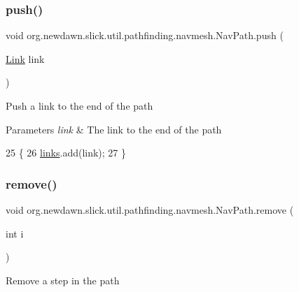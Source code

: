 \subsubsection{\texorpdfstring{push()}{push()}}
{\footnotesize\ttfamily void org.\+newdawn.\+slick.\+util.\+pathfinding.\+navmesh.\+Nav\+Path.\+push (\begin{DoxyParamCaption}\item[{\mbox{\hyperlink{classorg_1_1newdawn_1_1slick_1_1util_1_1pathfinding_1_1navmesh_1_1_link}{Link}}}]{link }\end{DoxyParamCaption})\hspace{0.3cm}{\ttfamily [inline]}}

Push a link to the end of the path


\begin{DoxyParams}{Parameters}
{\em link} & The link to the end of the path \\
\hline
\end{DoxyParams}

\begin{DoxyCode}
25                                 \{
26         \mbox{\hyperlink{classorg_1_1newdawn_1_1slick_1_1util_1_1pathfinding_1_1navmesh_1_1_nav_path_aa79523223a18486178fbb21fe550f253}{links}}.add(link);
27     \}
\end{DoxyCode}
\mbox{\label{classorg_1_1newdawn_1_1slick_1_1util_1_1pathfinding_1_1navmesh_1_1_nav_path_a9c30f810bc9b2eba2b244a34f26d1f88}} 
\subsubsection{\texorpdfstring{remove()}{remove()}}
{\footnotesize\ttfamily void org.\+newdawn.\+slick.\+util.\+pathfinding.\+navmesh.\+Nav\+Path.\+remove (\begin{DoxyParamCaption}\item[{int}]{i }\end{DoxyParamCaption})\hspace{0.3cm}{\ttfamily [inline]}}

Remove a step in the path


